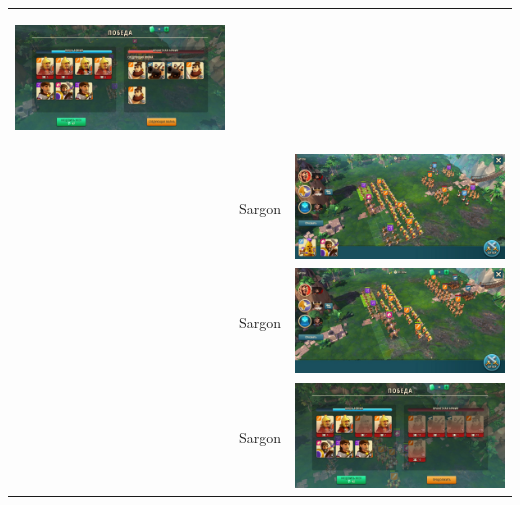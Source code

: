 \begin{longtable}{|c|c|c|}
    \hypertarget{fight33}{\includegraphics[width=0.75\linewidth]{./parts/media/TreasureHunt/33/sargon/photo_2022-04-07_10-06-34.jpg}} \\
    & Sargon &
    \includegraphics[width=0.75\linewidth]{./parts/media/TreasureHunt/33/sargon/photo_2022-04-07_10-06-22.jpg} \\
    & Sargon &
    \includegraphics[width=0.75\linewidth]{./parts/media/TreasureHunt/33/sargon/photo_2022-04-07_10-06-37.jpg} \\
    & Sargon &
    \includegraphics[width=0.75\linewidth]{./parts/media/TreasureHunt/33/sargon/photo_2022-04-07_10-06-40.jpg} \\

\end{longtable}
